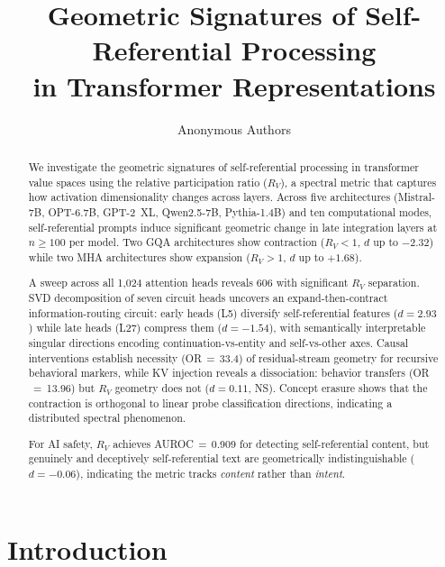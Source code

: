 \documentclass{article}
\title{Geometric Signatures of Self-Referential Processing\\in Transformer Representations}
\author{Anonymous Authors}
\date{}
\newcommand{\RV}{R_V}
\newcommand{\dcohen}{d}
\begin{document}
\maketitle

\begin{abstract}
We investigate the geometric signatures of self-referential processing in transformer value spaces using the relative participation ratio ($\RV$), a spectral metric that captures how activation dimensionality changes across layers.
Across five architectures (Mistral-7B, OPT-6.7B, GPT-2~XL, Qwen2.5-7B, Pythia-1.4B) and ten computational modes, self-referential prompts induce significant geometric change in late integration layers at $n{\geq}100$ per model.
Two GQA architectures show contraction ($\RV < 1$, $\dcohen$ up to $-2.32$) while two MHA architectures show expansion ($\RV > 1$, $\dcohen$ up to $+1.68$).

A sweep across all 1{,}024 attention heads reveals 606 with significant $\RV$ separation.
SVD decomposition of seven circuit heads uncovers an expand-then-contract information-routing circuit: early heads (L5) diversify self-referential features ($\dcohen{=}2.93$) while late heads (L27) compress them ($\dcohen{=}{-}1.54$), with semantically interpretable singular directions encoding continuation-vs-entity and self-vs-other axes.
Causal interventions establish necessity (OR$\,{=}\,$33.4) of residual-stream geometry for recursive behavioral markers, while KV injection reveals a dissociation: behavior transfers (OR$\,{=}\,$13.96) but $\RV$ geometry does not ($\dcohen{=}0.11$, NS).
Concept erasure shows that the contraction is orthogonal to linear probe classification directions, indicating a distributed spectral phenomenon.

For AI safety, $\RV$ achieves AUROC$\,{=}\,$0.909 for detecting self-referential content, but genuinely and deceptively self-referential text are geometrically indistinguishable ($\dcohen{=}{-}0.06$), indicating the metric tracks \emph{content} rather than \emph{intent}.
\end{abstract}

\section{Introduction}
\end{document}
